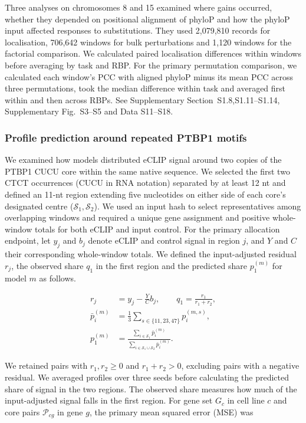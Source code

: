 \documentclass[webpdf,contemporary,large]{current_assets/oup-authoring-template}
\newcommand{\supfig}[1]{Supplementary Fig.~#1}
\newcommand{\supsect}[1]{Supplementary Section~#1}
\begin{document}
Three analyses on chromosomes 8 and 15 examined where gains occurred, whether they depended on positional alignment of phyloP and how the phyloP input affected responses to substitutions. They used 2,079,810 records for localisation, 706,642 windows for bulk perturbations and 1,120 windows for the factorial comparison. We calculated paired localisation differences within windows before averaging by task and RBP. For the primary permutation comparison, we calculated each window's PCC with aligned phyloP minus its mean PCC across three permutations, took the median difference within task and averaged first within and then across RBPs. See \supsect{S1.8,S1.11--S1.14}, \supfig{S3--S5} and Data S11--S18.

\subsubsection{Profile prediction around repeated PTBP1 motifs}\label{subsec:allocation_methods}

We examined how models distributed eCLIP signal around two copies of the PTBP1 CUCU core within the same native sequence. We selected the first two CTCT occurrences (CUCU in RNA notation) separated by at least 12 nt and defined an 11-nt region extending five nucleotides on either side of each core's designated centre ($\mathcal S_1,\mathcal S_2$). We used an input hash to select representatives among overlapping windows and required a unique gene assignment and positive whole-window totals for both eCLIP and input control. For the primary allocation endpoint, let $y_j$ and $b_j$ denote eCLIP and control signal in region $j$, and $Y$ and $C$ their corresponding whole-window totals. We defined the input-adjusted residual $r_j$, the observed share $q_1$ in the first region and the predicted share $p_1^{(m)}$ for model $m$ as follows.

\begin{equation}
\begin{aligned}
r_j&=y_j-\frac{Y}{C}b_j,\qquad
q_1=\frac{r_1}{r_1+r_2},\\
\bar p_i^{(m)}&=\frac13\sum_{s\in\{11,23,47\}}p_i^{(m,s)},\\
p_1^{(m)}&=
\frac{\sum_{i\in\mathcal S_1}\bar p_i^{(m)}}
{\sum_{i\in\mathcal S_1\cup\mathcal S_2}\bar p_i^{(m)}}.
\end{aligned}
\label{eq:allocation_readout}
\end{equation}

We retained pairs with $r_1,r_2\geq0$ and $r_1+r_2>0$, excluding pairs with a negative residual. We averaged profiles over three seeds before calculating the predicted share of signal in the two regions. The observed share measures how much of the input-adjusted signal falls in the first region. For gene set $G_c$ in cell line $c$ and core pairs $\mathcal P_{cg}$ in gene $g$, the primary mean squared error (MSE) was
\end{document}
